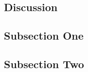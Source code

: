 \documentclass[twoside]{article}
\begin{document}
\begin{multicols}{2}
\section{Discussion}

\subsection{Subsection One}



\subsection{Subsection Two}










\end{multicols}
\end{document}
